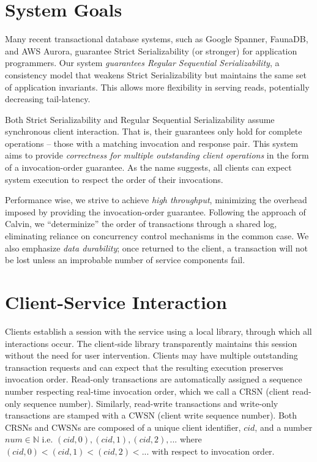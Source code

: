 \documentclass{article}
\begin{document}
\section{System Goals}
\par Many recent transactional database systems, such as Google Spanner, FaunaDB, and AWS Aurora, guarantee Strict Serializability (or stronger) for application programmers. Our system \emph{guarantees Regular Sequential Serializability}, a consistency model that weakens Strict Serializability but maintains the same set of application invariants. This allows more flexibility in serving reads, potentially decreasing tail-latency. 
\par Both Strict Serializability and Regular Sequential Serializability assume synchronous client interaction. That is, their guarantees only hold for complete operations -- those with a matching invocation and response pair. This system aims to provide \emph{correctness for multiple outstanding client operations} in the form of a invocation-order guarantee. As the name suggests, all clients can expect system execution to respect the order of their invocations. 
\par Performance wise, we strive to achieve \emph{high throughput}, minimizing the overhead imposed by providing the invocation-order guarantee. Following the approach of Calvin, we ``determinize'' the order of transactions through a shared log, eliminating reliance on concurrency control mechanisms in the common case. We also emphasize \emph{data durability}; once returned to the client, a transaction will not be lost unless an improbable number of service components fail. 

\section{Client-Service Interaction}
\par Clients establish a session with the service using a local library, through which all interactions occur. The client-side library transparently maintains this session without the need for user intervention. Clients may have multiple outstanding transaction requests and can expect that the resulting execution preserves invocation order. Read-only transactions are automatically assigned a sequence number respecting real-time invocation order, which we call a CRSN (client read-only sequence number). Similarly, read-write transactions and write-only transactions are stamped with a CWSN (client write sequence number). Both CRSNs and CWSNs are composed of a unique client identifier, $cid$, and a number $num \in \mathbb{N}$ i.e. $(cid, 0), (cid, 1), (cid, 2),...$ where $(cid, 0) < (cid, 1) < (cid, 2) < ...$ with respect to invocation order.
\end{document}
